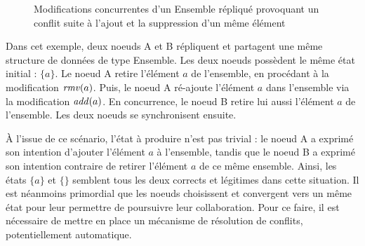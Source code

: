 \begin{figure}[!ht]

  \centering
  \caption{Modifications concurrentes d'un Ensemble répliqué provoquant un conflit suite à l'ajout et la suppression d'un même élément}
  \label{fig:set-conflict}
\end{figure}

Dans cet exemple, deux noeuds A et B répliquent et partagent une même structure de données de type Ensemble.
Les deux noeuds possèdent le même état initial : $\{a\}$.
Le noeud A retire l'élément $a$ de l'ensemble, en procédant à la modification $\mathit{rmv}(a)$.
Puis, le noeud A ré-ajoute l'élément $a$ dans l'ensemble via la modification $\mathit{add}(a)$.
En concurrence, le noeud B retire lui aussi l'élément $a$ de l'ensemble.
Les deux noeuds se synchronisent ensuite.

À l'issue de ce scénario, l'état à produire n'est pas trivial : le noeud A a exprimé son intention d'ajouter l'élément $a$ à l'ensemble, tandis que le noeud B a exprimé son intention contraire de retirer l'élément $a$ de ce même ensemble.
Ainsi, les états $\{a\}$ et $\{\}$ semblent tous les deux corrects et légitimes dans cette situation.
Il est néanmoins primordial que les noeuds choisissent et convergent vers un même état pour leur permettre de poursuivre leur collaboration.
Pour ce faire, il est nécessaire de mettre en place un mécanisme de résolution de conflits, potentiellement automatique.

